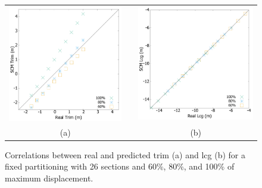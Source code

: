 \documentclass[runningheads]{llncs}
\begin{document}
\begin{figure}[h!]
\begin{center}
 \begin{tabular}{ccc}
  \includegraphics[scale=0.15]{figures/TrimScatter} & & \includegraphics[scale=0.15]{figures/LcgScatter} \\
  (a) & \hspace{5mm} & (b)
\end{tabular}  
\end{center}
\caption{Correlations between real and predicted trim (a) and lcg (b) for a fixed partitioning with 26 sections and 60\%, 80\%, and 100\% of maximum displacement.}
\label{fig:trimlcgscatter}
\end{figure}
\end{document}
